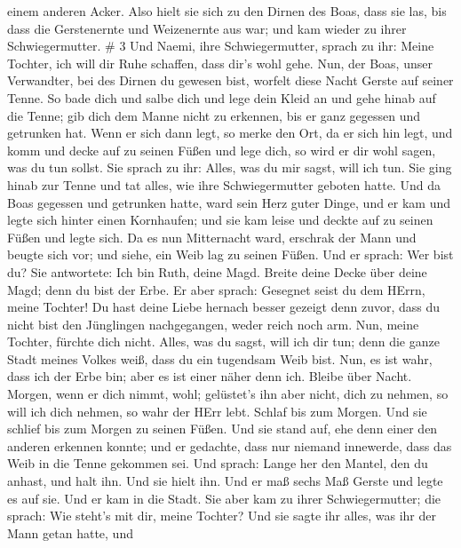 einem anderen Acker.  Also hielt sie sich zu den Dirnen des
Boas, dass sie las, bis dass die Gerstenernte und Weizenernte aus war;
und kam wieder zu ihrer Schwiegermutter. \# 3  Und Naemi,
ihre Schwiegermutter, sprach zu ihr: Meine Tochter, ich will dir Ruhe
schaffen, dass dir's wohl gehe.  Nun, der Boas, unser
Verwandter, bei des Dirnen du gewesen bist, worfelt diese Nacht Gerste
auf seiner Tenne.  So bade dich und salbe dich und lege dein
Kleid an und gehe hinab auf die Tenne; gib dich dem Manne nicht zu
erkennen, bis er ganz gegessen und getrunken hat.  Wenn er
sich dann legt, so merke den Ort, da er sich hin legt, und komm und
decke auf zu seinen Füßen und lege dich, so wird er dir wohl sagen, was
du tun sollst.  Sie sprach zu ihr: Alles, was du mir sagst,
will ich tun.  Sie ging hinab zur Tenne und tat alles, wie
ihre Schwiegermutter geboten hatte.  Und da Boas gegessen
und getrunken hatte, ward sein Herz guter Dinge, und er kam und legte
sich hinter einen Kornhaufen; und sie kam leise und deckte auf zu seinen
Füßen und legte sich.  Da es nun Mitternacht ward, erschrak
der Mann und beugte sich vor; und siehe, ein Weib lag zu seinen Füßen.
 Und er sprach: Wer bist du? Sie antwortete: Ich bin Ruth,
deine Magd. Breite deine Decke über deine Magd; denn du bist der Erbe.
 Er aber sprach: Gesegnet seist du dem HErrn, meine
Tochter! Du hast deine Liebe hernach besser gezeigt denn zuvor, dass du
nicht bist den Jünglingen nachgegangen, weder reich noch arm.
 Nun, meine Tochter, fürchte dich nicht. Alles, was du
sagst, will ich dir tun; denn die ganze Stadt meines Volkes weiß, dass
du ein tugendsam Weib bist.  Nun, es ist wahr, dass ich der
Erbe bin; aber es ist einer näher denn ich.  Bleibe über
Nacht. Morgen, wenn er dich nimmt, wohl; gelüstet's ihn aber nicht, dich
zu nehmen, so will ich dich nehmen, so wahr der HErr lebt. Schlaf bis
zum Morgen.  Und sie schlief bis zum Morgen zu seinen
Füßen. Und sie stand auf, ehe denn einer den anderen erkennen konnte;
und er gedachte, dass nur niemand innewerde, dass das Weib in die Tenne
gekommen sei.  Und sprach: Lange her den Mantel, den du
anhast, und halt ihn. Und sie hielt ihn. Und er maß sechs Maß Gerste und
legte es auf sie. Und er kam in die Stadt.  Sie aber kam zu
ihrer Schwiegermutter; die sprach: Wie steht's mit dir, meine Tochter?
Und sie sagte ihr alles, was ihr der Mann getan hatte,  und
